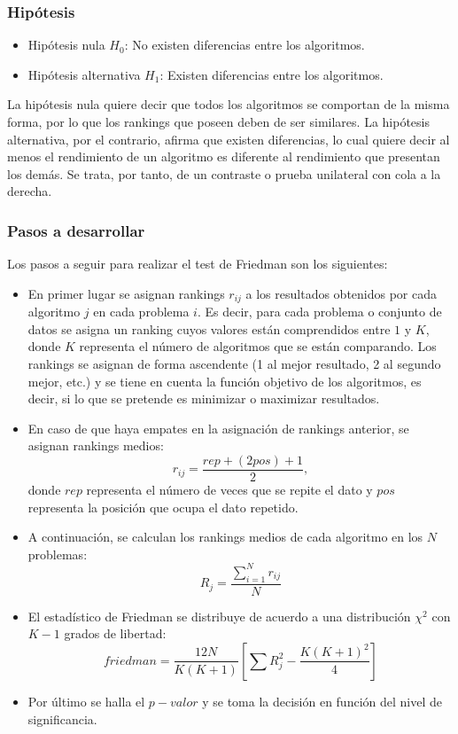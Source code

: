 \subsubsection{Hipótesis}
\begin{itemize}
\item Hipótesis nula $H_0$: No existen diferencias entre los algoritmos.
\item Hipótesis alternativa $H_1$: Existen diferencias entre los algoritmos.
\end{itemize}
La hipótesis nula quiere decir que todos los algoritmos se comportan de la misma forma, por lo que los rankings
que poseen deben de ser similares. La hipótesis alternativa, por el contrario, afirma que existen diferencias,
lo cual quiere decir al menos el rendimiento de un algoritmo es diferente al rendimiento que presentan los demás.
Se trata, por tanto, de un contraste o prueba unilateral con cola a la derecha.

\subsubsection{Pasos a desarrollar}
Los pasos a seguir para realizar el test de Friedman son los siguientes:
\begin{itemize}
\item En primer lugar se asignan rankings $r_{ij}$ a los resultados obtenidos por cada algoritmo $j$ en cada
problema $i$. Es decir, para cada problema o conjunto de datos se asigna un ranking cuyos valores están
comprendidos entre $1$ y $K$, donde $K$ representa el número de algoritmos que se están comparando. Los rankings
se asignan de forma ascendente (1 al mejor resultado, 2 al segundo mejor, etc.) y se tiene en cuenta la función
objetivo de los algoritmos, es decir, si lo que se pretende es minimizar o maximizar resultados.
\item En caso de que haya empates en la asignación de rankings anterior, se asignan rankings medios:
\[ r_{ij} = \frac{rep + (2pos) + 1}{2}, \]
donde $rep$ representa el número de veces que se repite el dato y $pos$ representa la posición que ocupa
el dato repetido.
\item A continuación, se calculan los rankings medios de cada algoritmo en los $N$ problemas:
\[ R_j = \frac{\sum_{i=1}^{N} r_{ij}}{N} \]
\item El estadístico de Friedman se distribuye de acuerdo a una distribución $\chi^2$ con $K-1$ grados de
libertad:
\[ friedman = \frac{12N}{K(K+1)} \left[\sum R_j^2 - \frac{K(K+1)^2}{4} \right] \]
\item Por último se halla el $p-valor$ y se toma la decisión en función del nivel de significancia.
\end{itemize}

